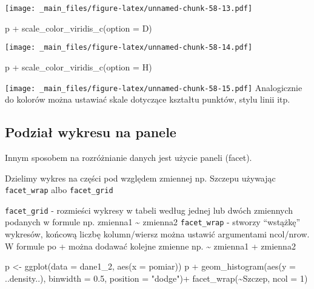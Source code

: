 \documentclass[
]{book}
\newenvironment{Shaded}{\begin{snugshade}}{\end{snugshade}}
\newcommand{\AttributeTok}[1]{\textcolor[rgb]{0.77,0.63,0.00}{#1}}
\newcommand{\DecValTok}[1]{\textcolor[rgb]{0.00,0.00,0.81}{#1}}
\newcommand{\FloatTok}[1]{\textcolor[rgb]{0.00,0.00,0.81}{#1}}
\newcommand{\FunctionTok}[1]{\textcolor[rgb]{0.00,0.00,0.00}{#1}}
\newcommand{\NormalTok}[1]{#1}
\newcommand{\OtherTok}[1]{\textcolor[rgb]{0.56,0.35,0.01}{#1}}
\newcommand{\SpecialCharTok}[1]{\textcolor[rgb]{0.00,0.00,0.00}{#1}}
\newcommand{\StringTok}[1]{\textcolor[rgb]{0.31,0.60,0.02}{#1}}
\begin{document}
\texttt{[image: \_main\_files/figure-latex/unnamed-chunk-58-13.pdf]}

\begin{Shaded}
\begin{Highlighting}[]
\NormalTok{p }\SpecialCharTok{+} \FunctionTok{scale\_color\_viridis\_c}\NormalTok{(}\AttributeTok{option =} \StringTok{\textquotesingle{}D\textquotesingle{}}\NormalTok{)}
\end{Highlighting}
\end{Shaded}

\texttt{[image: \_main\_files/figure-latex/unnamed-chunk-58-14.pdf]}

\begin{Shaded}
\begin{Highlighting}[]
\NormalTok{p }\SpecialCharTok{+} \FunctionTok{scale\_color\_viridis\_c}\NormalTok{(}\AttributeTok{option =} \StringTok{\textquotesingle{}H\textquotesingle{}}\NormalTok{)}
\end{Highlighting}
\end{Shaded}

\texttt{[image: \_main\_files/figure-latex/unnamed-chunk-58-15.pdf]}
Analogicznie do kolorów można ustawiać skale dotyczące kształtu punktów, stylu linii itp.

\hypertarget{podziaux142-wykresu-na-panele}{%
\subsection{Podział wykresu na panele}\label{podziaux142-wykresu-na-panele}}

Innym sposobem na rozróżnianie danych jest użycie paneli (facet).

Dzielimy wykres na części pod względem zmiennej np. Szczepu używając \texttt{facet\_wrap} albo \texttt{facet\_grid}

\texttt{facet\_grid} - rozmieści wykresy w tabeli według jednej lub dwóch zmiennych podanych w formule np. zmienna1 \textasciitilde{} zmienna2
\texttt{facet\_wrap} - stworzy ``wstążkę'' wykresów, końcową liczbę kolumn/wiersz można ustawić argumentami ncol/nrow. W formule po + można dodawać kolejne zmienne np. \textasciitilde{} zmienna1 + zmienna2

\begin{Shaded}
\begin{Highlighting}[]
\NormalTok{p }\OtherTok{\textless{}{-}} \FunctionTok{ggplot}\NormalTok{(}\AttributeTok{data =}\NormalTok{ dane1\_2, }\FunctionTok{aes}\NormalTok{(}\AttributeTok{x =}\NormalTok{ pomiar))}
\NormalTok{p }\SpecialCharTok{+} \FunctionTok{geom\_histogram}\NormalTok{(}\FunctionTok{aes}\NormalTok{(}\AttributeTok{y =}\NormalTok{ ..density..), }\AttributeTok{binwidth =} \FloatTok{0.5}\NormalTok{, }\AttributeTok{position =} \StringTok{"dodge"}\NormalTok{)}\SpecialCharTok{+}
  \FunctionTok{facet\_wrap}\NormalTok{(}\SpecialCharTok{\textasciitilde{}}\NormalTok{Szczep, }\AttributeTok{ncol =} \DecValTok{1}\NormalTok{)}
\end{Highlighting}
\end{Shaded}
\end{document}
